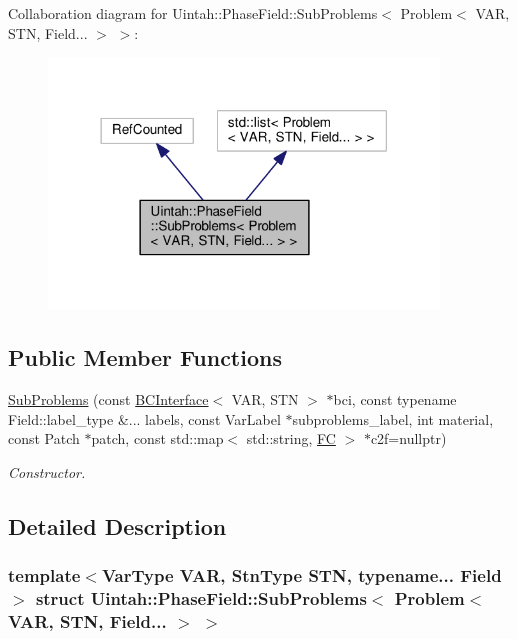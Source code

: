Collaboration diagram for Uintah\+:\+:Phase\+Field\+:\+:Sub\+Problems$<$ Problem$<$ V\+AR, S\+TN, Field... $>$ $>$\+:\nopagebreak
\begin{figure}[H]
\begin{center}
\leavevmode
\includegraphics[width=294pt]{structUintah_1_1PhaseField_1_1SubProblems_3_01Problem_3_01VAR_00_01STN_00_01Field_8_8_8_01_4_01_4__coll__graph}
\end{center}
\end{figure}
\subsection*{Public Member Functions}
\begin{DoxyCompactItemize}
\item 
\hyperlink{structUintah_1_1PhaseField_1_1SubProblems_3_01Problem_3_01VAR_00_01STN_00_01Field_8_8_8_01_4_01_4_a4af57b0128042280f2511f3ffcca401b}{Sub\+Problems} (const \hyperlink{structUintah_1_1PhaseField_1_1BCInterface}{B\+C\+Interface}$<$ V\+AR, S\+TN $>$ $\ast$bci, const typename Field\+::label\+\_\+type \&... labels, const Var\+Label $\ast$subproblems\+\_\+label, int material, const Patch $\ast$patch, const std\+::map$<$ std\+::string, \hyperlink{namespaceUintah_1_1PhaseField_aeb51fe956fe07f1487f5878f4039f27c}{FC} $>$ $\ast$c2f=nullptr)
\begin{DoxyCompactList}\small\item\em Constructor. \end{DoxyCompactList}\end{DoxyCompactItemize}


\subsection{Detailed Description}
\subsubsection*{template$<$Var\+Type V\+AR, Stn\+Type S\+TN, typename... Field$>$\newline
struct Uintah\+::\+Phase\+Field\+::\+Sub\+Problems$<$ Problem$<$ V\+A\+R, S\+T\+N, Field... $>$ $>$}

